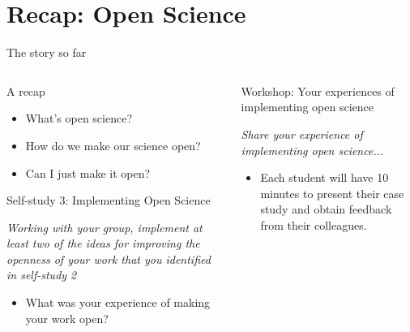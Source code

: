 \section{Recap: Open Science}
\label{sec:course}

\begin{frame}{The story so far}

\begin{columns}[c]
    \begin{column}{.45\textwidth}

        \begin{block}{A recap}
            \begin{itemize}
                \item What's open science?
                \item How do we make our science open?
                \item Can I just make it open?
            \end{itemize}
        \end{block}
    
        \pause
    
        \begin{block}{Self-study 3: Implementing Open Science}
        
            \textit{Working with your group, implement at least two of the ideas for improving the openness of your work that you identified in self-study 2}

            \begin{itemize}
                \item What was your experience of making your work open?
            \end{itemize}

        \end{block}

    \end{column}

    \begin{column}{.45\textwidth}

        \begin{block}{Workshop: Your experiences of implementing open science}
        
            \textit{Share your experience of implementing open science... }

            \begin{itemize}
                \item Each student will have 10 minutes to present their case study and obtain feedback from their colleagues.
            \end{itemize}
        \end{block}

    \end{column}

\end{columns}


\end{frame}


